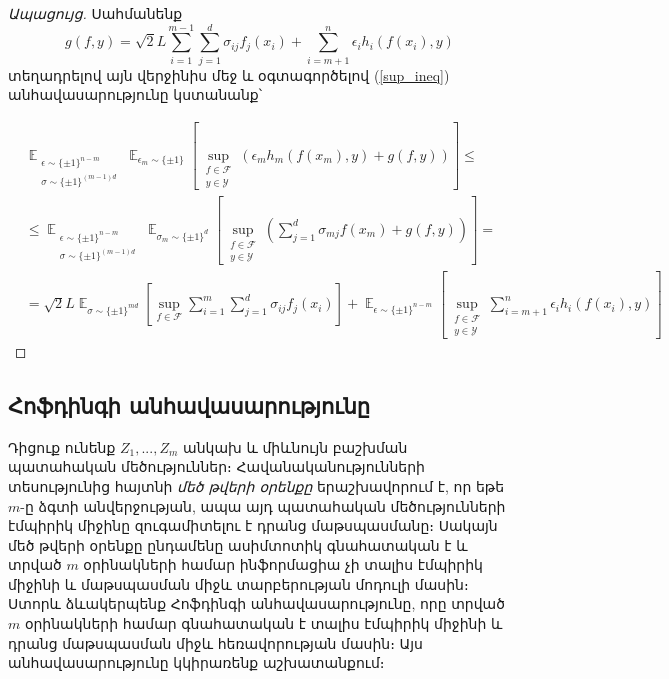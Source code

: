 \documentclass[12pt]{article}
\DeclareMathOperator*{\E}{\mathbb{E}}
\begin{document}
\begin{proof}[Ապացույց]
Սահմանենք $$g(f, y) = \sqrt{2}L\sum_{i=1}^{m-1}\sum_{j=1}^d{\sigma_{ij}f_j(x_i)}  + \sum_{i = m+1}^n\epsilon_ih_i(f(x_i), y)$$ տեղադրելով այն վերջինիս մեջ և օգտագործելով (\ref{sup_ineq}) անհավասարությունը կստանանք՝


\begin{align*}
 &\E_{\substack{\epsilon \sim \{ \pm 1\}^{n-m}   \\ \sigma \sim \{ \pm 1\}^{(m-1)d} }}     \E_{\epsilon_m \sim \{ \pm1 \}} \left [          \sup_{\substack{f \in \mathcal{F} \\ y \in \mathcal{Y}}}     \left(\epsilon_m h_m(f(x_m), y)   +   g(f, y)			\right )	\right ] \leq \\
 &\leq  \E_{\substack{\epsilon \sim \{ \pm 1\}^{n-m}   \\ \sigma \sim \{ \pm 1\}^{(m-1)d} }}     \E_{\sigma_m \sim \{ \pm1 \}^d} \left [          \sup_{\substack{f \in \mathcal{F} \\ y \in \mathcal{Y}}}     \left( \sum_{j = 1}^d  \sigma_{mj}f(x_m) +   g(f, y)			\right )	\right ] =\\
 &= \sqrt{2}L \E_{\sigma \sim \{\pm1\}^{md}} \left[  \sup_{f \in \mathcal{F}}  \sum_{i=1}^m\sum_{j=1}^d{\sigma_{ij}f_j(x_i)}   \right] + \E_{\epsilon \sim \{\pm 1\}^{n-m}}\left[\sup_{\substack{f \in \mathcal{F} \\ y \in \mathcal{Y}} }  \sum_{i=m+1}^n{\epsilon_ih_i(f(x_i), y)}  \right] 
\end{align*}


\end{proof}
  




{}


\subsection*{\hfill Հոֆդինգի անհավասարությունը \hfill} \noindent

 Դիցուք ունենք $Z_1, ..., Z_m$ անկախ և միևնույն բաշխման պատահական մեծություններ։ Հավանականությունների տեսությունից հայտնի \textit{մեծ թվերի օրենքը} երաշխավորում է, որ եթե $m$-ը ձգտի անվերջության, ապա
 այդ պատահական մեծությունների էմպիրիկ միջինը զուգամիտելու է դրանց մաթսպասմանը։ Սակայն մեծ թվերի օրենքը ընդամենը ասիմտոտիկ գնահատական է և տրված $m$ օրինակների համար ինֆորմացիա չի տալիս էմպիրիկ միջինի և մաթսպասման միջև տարբերության մոդուլի մասին։ Ստորև ձևակերպենք Հոֆդինգի անհավասարությունը, որը տրված $m$ օրինակների համար գնահատական է տալիս էմպիրիկ միջինի և դրանց մաթսպասման  միջև հեռավորության մասին։ Այս անհավասարությունը կկիրառենք աշխատանքում։ 
\end{document}
